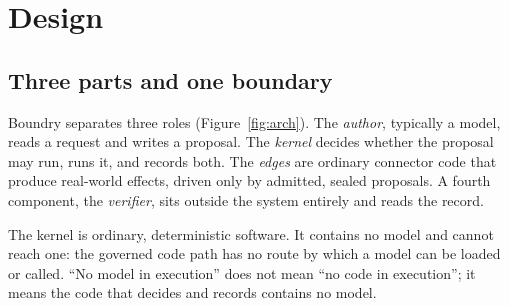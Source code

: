 \documentclass[11pt,a4paper]{article}
\begin{document}
\section{Design}\label{sec:design}

\subsection{Three parts and one boundary}

Boundry separates three roles (Figure~\ref{fig:arch}). The \emph{author}, typically a model, reads a request and writes a proposal. The \emph{kernel} decides whether the proposal may run, runs it, and records both. The \emph{edges} are ordinary connector code that produce real-world effects, driven only by admitted, sealed proposals. A fourth component, the \emph{verifier}, sits outside the system entirely and reads the record.

The kernel is ordinary, deterministic software. It contains no model and cannot reach one: the governed code path has no route by which a model can be loaded or called. ``No model in execution'' does not mean ``no code in execution''; it means the code that decides and records contains no model.
\end{document}
